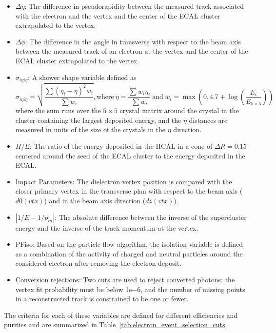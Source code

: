 \begin{itemize}
    \item $\Delta\eta$: The difference in pseudorapidity between the measured track associated with the electron and the vertex and the center of the ECAL cluster extrapolated to the vertex.
    \item $\Delta\phi$: The difference in the angle in transverse with respect to the beam axis between the measured track of an electron at the vertex and the center of the ECAL cluster extrapolated to the vertex.
    \item $\sigma_{i\eta i\eta}$: A shower shape variable defined as \begin{equation*} \sigma_{i\eta i\eta} = \sqrt{\frac{\sum (\eta_i - \overline{\eta})^2 w_i}{\sum w_i}}\mathrm{, where \ } \overline{\eta} = \frac{\sum w_i \eta_i}{\sum w_i} \mathrm{\ and \ } w_i = \max\left( 0, 4.7 + \log\left(\frac{E_i}{E_{5\times 5}}\right) \right) \end{equation*} where the sum runs over the $5\times 5$ crystal matrix around the crystal in the cluster containing the largest deposited energy, and the $\eta$ distances are measured in units of the size of the crystals in the $\eta$ direction.
    \item $H/E$: The ratio of the energy deposited in the HCAL in a cone of $\Delta R = 0.15$ centered around the seed of the ECAL cluster to the energy deposited in the ECAL.
    \item Impact Parameters: The dielectron vertex position is compared with the closer primary vertex in the transverse plan with respect to the beam axis ($d0(vtx)$) and in the beam axis direction ($dz(vtx)$).
    \item $|1/E - 1/p_{in}|$: The absolute difference between the inverse of the supercluster energy and the inverse of the track momentum at the vertex.
    \item PFiso: Based on the particle flow algorithm, the isolation variable is defined as a combination of the activity of charged and neutral particles around the considered electron after removing the electron deposit.
    \item Conversion rejections: Two cuts are used to reject converted photons: the vertex fit probability must be below 1e$-6$, and the number of missing points in a reconstructed track is constrained to be one or fewer.
\end{itemize}

The criteria for each of these variables are defined for different efficiencies and purities and are summarized in Table~\ref{tab:electron_event_selection_cuts}.

